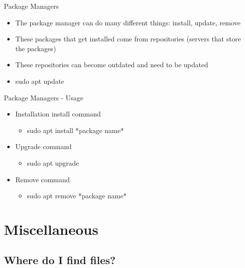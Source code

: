 \documentclass{beamer}
\begin{document}
\begin{frame}{Package Managers}
  \begin{itemize}
      \item The package manager can do many different things: install, update, remove
      \item These packages that get installed come from repositories (servers that store the packages)
      \item These repositories can become outdated and need to be updated
      \item sudo apt update
  \end{itemize}
\end{frame}

\begin{frame}{Package Managers - Usage}
    \begin{itemize}
        \item Installation install command
            \begin{itemize}
                \item sudo apt install *package name*
            \end{itemize}
        \item Upgrade command
            \begin{itemize}
                \item sudo apt upgrade
            \end{itemize}
        \item Remove command
            \begin{itemize}
                \item sudo apt remove *package name*
            \end{itemize}
    \end{itemize}
\end{frame}

\section{Miscellaneous}

\subsection{Where do I find files?}
\end{document}
